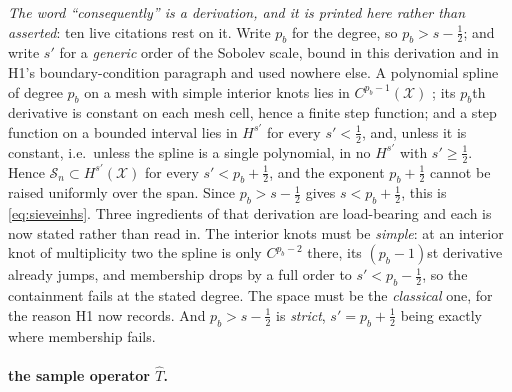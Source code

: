 \emph{The word ``consequently'' is a derivation, and it is printed here rather than asserted}: ten live
citations rest on it. Write $p_b$ for the degree, so $p_b>s-\tfrac12$; and write $s'$ for a
\emph{generic} order of the Sobolev scale, bound in this derivation and in H1's
boundary-condition paragraph and used nowhere else.
A polynomial spline of
degree $p_b$ on a mesh with simple interior knots lies in $C^{p_b-1}(\mathcal X)$
\citep{schumaker2007}; its $p_b$th derivative is constant on each mesh cell, hence a finite step function;
and a step function on a bounded interval lies in $H^{s'}$ for every $s'<\tfrac12$, and, unless it
is constant, i.e.\ unless the spline is a single polynomial, in no $H^{s'}$ with $s'\ge\tfrac12$.
Hence $\mathcal S_n\subset H^{s'}(\mathcal X)$ for every $s'<p_b+\tfrac12$, and the exponent
$p_b+\tfrac12$ cannot be raised uniformly over the span. Since $p_b>s-\tfrac12$ gives $s<p_b+\tfrac12$,
this is
\eqref{eq:sieveinhs}. Three ingredients of that derivation are load-bearing and each is now stated
rather than read in. The interior knots must be \emph{simple}: at an interior knot of multiplicity two
the spline is only $C^{p_b-2}$ there, its $(p_b-1)$st derivative already jumps, and membership drops by a
full order to $s'<p_b-\tfrac12$, so the containment fails at the stated degree.
The space must be the \emph{classical} one, for the
reason H1 now records. And $p_b>s-\tfrac12$ is \emph{strict}, $s'=p_b+\tfrac12$ being
exactly where membership fails.

\paragraph{the sample operator $\hat T$.}

